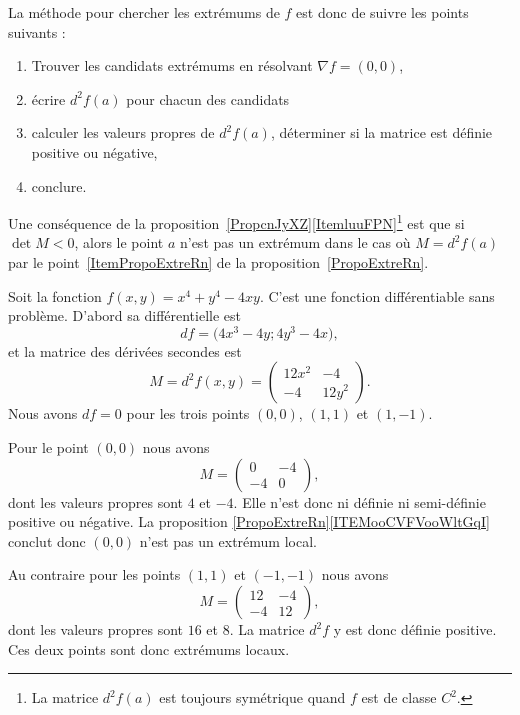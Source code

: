 La méthode pour chercher les extrémums de \( f\) est donc de suivre les points suivants :
\begin{enumerate}
	\item
	      Trouver les candidats extrémums en résolvant \( \nabla f=(0,0)\),
	\item
	      écrire \( d^2f(a)\) pour chacun des candidats
	\item
	      calculer les valeurs propres de \( d^2f(a)\), déterminer si la matrice est définie positive ou négative,
	\item
	      conclure.
\end{enumerate}

Une conséquence de la proposition~\ref{PropcnJyXZ}\ref{ItemluuFPN}\footnote{La matrice \( d^2f(a)\) est toujours symétrique quand \( f\) est de classe \( C^2\).} est que si \( \det M<0\), alors le point \( a\) n'est pas  un extrémum dans le cas où \( M=d^2f(a)\) par le point~\ref{ItemPropoExtreRn} de la proposition~\ref{PropoExtreRn}.

\begin{example}
	Soit la fonction \( f(x,y)=x^4+y^4-4xy\). C'est une fonction différentiable sans problème. D'abord sa différentielle est
	\begin{equation}
		df=\big(4x^3-4y;4y^3-4x),
	\end{equation}
	et la matrice des dérivées secondes est
	\begin{equation}
		M=d^2f(x,y)=\begin{pmatrix}
			12x^2 & -4    \\
			-4    & 12y^2
		\end{pmatrix}.
	\end{equation}
	Nous avons \( df=0\) pour les trois points \( (0,0)\), \( (1,1)\) et \( (1,-1)\).

	Pour le point \( (0,0)\) nous avons
	\begin{equation}
		M=\begin{pmatrix}
			0  & -4 \\
			-4 & 0
		\end{pmatrix},
	\end{equation}
	dont les valeurs propres sont \( 4\) et \( -4\). Elle n'est donc ni définie ni semi-définie positive ou négative. La proposition \ref{PropoExtreRn}\ref{ITEMooCVFVooWltGqI} conclut donc \( (0,0)\) n'est pas un extrémum local.

	Au contraire pour les points \( (1,1)\) et \( (-1,-1)\) nous avons
	\begin{equation}
		M=\begin{pmatrix}
			12 & -4 \\
			-4 & 12
		\end{pmatrix},
	\end{equation}
	dont les valeurs propres sont \( 16\) et \( 8\). La matrice \( d^2f\) y est donc définie positive. Ces deux points sont donc extrémums locaux.
\end{example}

